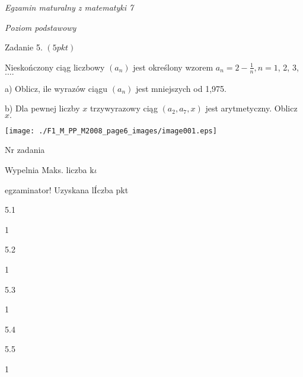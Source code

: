 \documentclass[a4paper,12pt]{article}
\begin{document}
{\it Egzamin maturalny z matematyki 7}

{\it Poziom podstawowy}

Zadanie 5. $(5pkt)$

Nieskończony ciąg liczbowy $(a_{n})$ jest określony wzorem $a_{n}=2-\displaystyle \frac{1}{n}, n=1$, 2, 3,$\ldots.$

a) Oblicz, ile wyrazów ciągu $(a_{n})$ jest mniejszych od 1,975.

b) Dla pewnej liczby $x$ trzywyrazowy ciąg $(a_{2},a_{7},x)$ jest arytmetyczny. Oblicz $x.$
\begin{center}
\texttt{[image: ./F1\_M\_PP\_M2008\_page6\_images/image001.eps]}
\end{center}
Nr zadania

Wypelnia Maks. liczba $\mathrm{k}\iota$

egzaminator! Uzyskana lÍczba pkt

5.1

1

5.2

1

5.3

1

5.4

5.5

1
\end{document}

